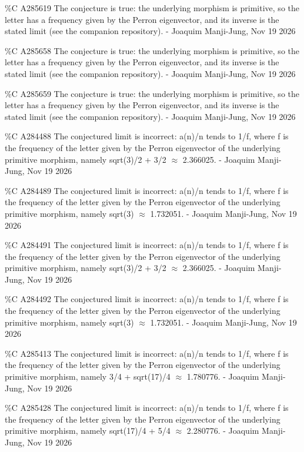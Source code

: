 {\%C A285619 The conjecture is true: the underlying morphism is primitive, so the letter has a frequency given by the Perron eigenvector, and its inverse is the stated limit (see the companion repository). - Joaquim Manji-Jung, Nov 19 2026\par
\%C A285658 The conjecture is true: the underlying morphism is primitive, so the letter has a frequency given by the Perron eigenvector, and its inverse is the stated limit (see the companion repository). - Joaquim Manji-Jung, Nov 19 2026\par
\%C A285659 The conjecture is true: the underlying morphism is primitive, so the letter has a frequency given by the Perron eigenvector, and its inverse is the stated limit (see the companion repository). - Joaquim Manji-Jung, Nov 19 2026\par
\%C A284488 The conjectured limit is incorrect: a(n)/n tends to 1/f, where f is the frequency of the letter given by the Perron eigenvector of the underlying primitive morphism, namely sqrt(3)/2 + 3/2 $\approx$ 2.366025. - Joaquim Manji-Jung, Nov 19 2026\par
\%C A284489 The conjectured limit is incorrect: a(n)/n tends to 1/f, where f is the frequency of the letter given by the Perron eigenvector of the underlying primitive morphism, namely sqrt(3) $\approx$ 1.732051. - Joaquim Manji-Jung, Nov 19 2026\par
\%C A284491 The conjectured limit is incorrect: a(n)/n tends to 1/f, where f is the frequency of the letter given by the Perron eigenvector of the underlying primitive morphism, namely sqrt(3)/2 + 3/2 $\approx$ 2.366025. - Joaquim Manji-Jung, Nov 19 2026\par
\%C A284492 The conjectured limit is incorrect: a(n)/n tends to 1/f, where f is the frequency of the letter given by the Perron eigenvector of the underlying primitive morphism, namely sqrt(3) $\approx$ 1.732051. - Joaquim Manji-Jung, Nov 19 2026\par
\%C A285413 The conjectured limit is incorrect: a(n)/n tends to 1/f, where f is the frequency of the letter given by the Perron eigenvector of the underlying primitive morphism, namely 3/4 + sqrt(17)/4 $\approx$ 1.780776. - Joaquim Manji-Jung, Nov 19 2026\par
\%C A285428 The conjectured limit is incorrect: a(n)/n tends to 1/f, where f is the frequency of the letter given by the Perron eigenvector of the underlying primitive morphism, namely sqrt(17)/4 + 5/4 $\approx$ 2.280776. - Joaquim Manji-Jung, Nov 19 2026\par
}
